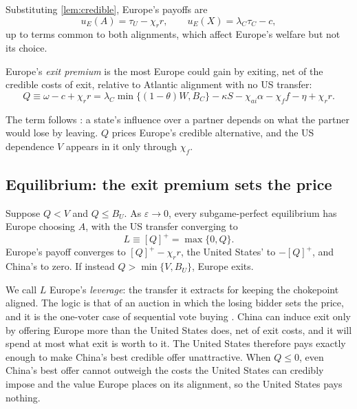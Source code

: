 Substituting \cref{lem:credible}, Europe's payoffs are
\begin{equation}\label{eq:uE}
u_E(A) = \tau_U - \chi_r r, \qquad u_E(X) = \lambda_C \tau_C - c,
\end{equation}
up to terms common to both alignments, which affect Europe's welfare but not its choice.

\begin{definition}\label{def:Q}
Europe's \emph{exit premium} is the most Europe could gain by exiting, net of the credible costs of exit, relative to Atlantic alignment with no US transfer:
\begin{equation}\label{eq:Q}
Q \equiv \omega - c + \chi_r r = \lambda_C\min\{(1-\theta)W, B_C\} - \kappa S - \chi_{ai}\alpha - \chi_f f - \eta + \chi_r r .
\end{equation}
\end{definition}

The term follows \citet{hirschman1945national}: a state's influence over a partner depends on what the partner would lose by leaving. $Q$ prices Europe's credible alternative, and the US dependence $V$ appears in it only through $\chi_f$.

\subsection{Equilibrium: the exit premium sets the price}

\begin{proposition}\label{prop:main}
Suppose $Q < V$ and $Q \leq B_U$. As $\varepsilon \to 0$, every subgame-perfect equilibrium has Europe choosing $A$, with the US transfer converging to
\begin{equation}\label{eq:L}
L \equiv [Q]^+ = \max\{0, Q\}.
\end{equation}
Europe's payoff converges to $[Q]^+ - \chi_r r$, the United States' to $-[Q]^+$, and China's to zero. If instead $Q > \min\{V, B_U\}$, Europe exits.
\end{proposition}

We call $L$ Europe's \emph{leverage}: the transfer it extracts for keeping the chokepoint aligned. The logic is that of an auction in which the losing bidder sets the price, and it is the one-voter case of sequential vote buying \citep{groseclose1996buying}. China can induce exit only by offering Europe more than the United States does, net of exit costs, and it will spend at most what exit is worth to it. The United States therefore pays exactly enough to make China's best credible offer unattractive. When $Q \leq 0$, even China's best offer cannot outweigh the costs the United States can credibly impose and the value Europe places on its alignment, so the United States pays nothing.

